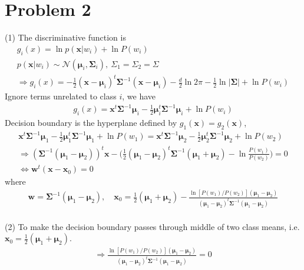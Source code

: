 \documentclass{article}
\begin{document}
\section{Problem 2}
(1)
The discriminative function is 
\begin{align}
	g_i(x) = \ln p(\mathbf{x} | w_i) + \ln P(w_i) \qquad\qquad\qquad\qquad\\
	p(\mathbf{x} | w_i) \sim \mathcal{N}(\mathbf{\mu}_i, \mathbf{\Sigma}_i),~ \Sigma_1 = \Sigma_2 = \Sigma \qquad\qquad\qquad\qquad\\
	\Rightarrow g_i(x) = -\frac{1}{2}(\mathbf{x} - \mathbf{\mu}_i)^t\mathbf{\Sigma}^{-1}(\mathbf{x} - \mathbf{\mu}_i) - \frac{d}{2}\ln 2\pi - \frac{1}{2}\ln |\mathbf{\Sigma}| + \ln P(w_i)\nonumber
\end{align}
Ignore terms unrelated to class $i$, we have 
\begin{align}
g_i(x) = \mathbf{x}^t\mathbf{\Sigma}^{-1}\mathbf{\mu}_i -\frac{1}{2}\mathbf{\mu}_i^t\mathbf{\Sigma}^{-1}\mathbf{\mu}_i + \ln P(w_i)
\end{align}
Decision boundary is the hyperplane defined by $g_1(\mathbf{x}) = g_2(\mathbf{x})$, 
\begin{align}
\mathbf{x}^t\mathbf{\Sigma}^{-1}\mathbf{\mu}_1 -\frac{1}{2}\mathbf{\mu}_1^t\mathbf{\Sigma}^{-1}\mathbf{\mu}_1 + \ln P(w_1) = \mathbf{x}^t\mathbf{\Sigma}^{-1}\mathbf{\mu}_2 -\frac{1}{2}\mathbf{\mu}_2^t\mathbf{\Sigma}^{-1}\mathbf{\mu}_2 + \ln P(w_2)\\
\Rightarrow (\mathbf{\Sigma}^{-1}(\mathbf{\mu}_1 - \mathbf{\mu}_2))^t\mathbf{x}-\Big(\frac{1}{2}(\mathbf{\mu}_1 - \mathbf{\mu}_2)^t\mathbf{\Sigma}^{-1}(\mathbf{\mu}_1 + \mathbf{\mu}_2) - \ln \frac{P(w_1)}{P(w_2)}\Big) =0\\
\Leftrightarrow \mathbf{w}^t(\mathbf{x} - \mathbf{x}_0) = 0 \qquad\qquad\qquad\qquad\qquad\qquad
\end{align}
where 
\begin{align}
\mathbf{w} = \mathbf{\Sigma}^{-1}(\mathbf{\mu}_1 - \mathbf{\mu}_2), \quad\mathbf{x}_0 = \frac{1}{2}(\mathbf{\mu}_1+\mathbf{\mu}_2) - \frac{\ln [P(w_1)/P(w_2)](\mathbf{\mu}_1 - \mathbf{\mu}_2)}{(\mathbf{\mu}_1 - \mathbf{\mu}_2)^t\mathbf{\Sigma}^{-1}(\mathbf{\mu}_1 - \mathbf{\mu}_2)}
\end{align} \\
\vspace{0.2in}
(2) To make the decision boundary passes through middle of two class means, i.e. $\mathbf{x}_0 = \frac{1}{2}(\mathbf{\mu}_1+\mathbf{\mu}_2)$.
\begin{align}
\Rightarrow \frac{\ln [P(w_1)/P(w_2)](\mathbf{\mu}_1 - \mathbf{\mu}_2)}{(\mathbf{\mu}_1 - \mathbf{\mu}_2)^t\mathbf{\Sigma}^{-1}(\mathbf{\mu}_1 - \mathbf{\mu}_2)} = 0 
\end{align}
\end{document}
